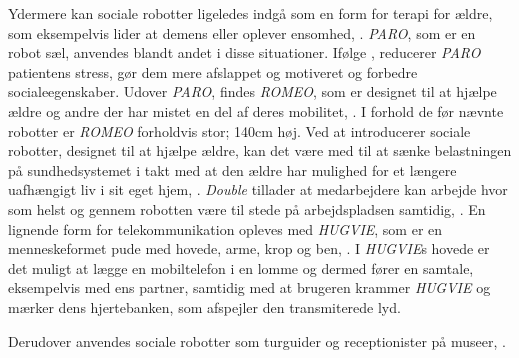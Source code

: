 Ydermere kan sociale robotter ligeledes indgå som en form for terapi for ældre, som eksempelvis lider at demens eller oplever ensomhed, \parencite[s. 110]{PDF:TheMobilePhoneAnEmontionalisedSR}. \textit{PARO}, som er en robot sæl, anvendes blandt andet i disse situationer. Ifølge \textcite{WEB:PARO}, reducerer \textit{PARO} patientens stress, gør dem mere afslappet og motiveret og forbedre socialeegenskaber. Udover \textit{PARO}, findes \textit{ROMEO}, som er designet til at hjælpe ældre og andre der har mistet en del af deres mobilitet, \parencite{WEB:ROMEO}. I forhold de før nævnte robotter er \textit{ROMEO} forholdvis stor; 140cm høj. Ved at introducerer sociale robotter, designet til at hjælpe ældre, kan det være med til at sænke belastningen på sundhedsystemet i takt med at den ældre har mulighed for et længere uafhængigt liv i sit eget hjem, \parencite[s. 1]{PDF:SharingALifeHarvey}.\blankline
%
\textit{Double} tillader at medarbejdere kan arbejde hvor som helst og gennem robotten være til stede på arbejdspladsen samtidig, \parencite{WEB:Double}. En lignende form for telekommunikation opleves med \textit{HUGVIE}, som er en menneskeformet pude med hovede, arme, krop og ben, \parencite[s. 78]{PDF:MinimizingTheHuman}. I \textit{HUGVIE}s hovede er det muligt at lægge en mobiltelefon i en lomme og dermed fører en samtale, eksempelvis med ens partner, samtidig med at brugeren krammer \textit{HUGVIE} og mærker dens hjertebanken, som afspejler den transmiterede lyd.

Derudover anvendes sociale robotter som turguider og receptionister på museer, \parencite[s. 22]{PDF:CloseButNotStuck}.
